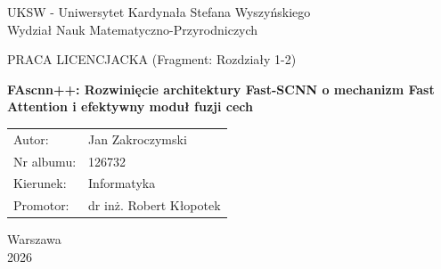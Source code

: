 \documentclass[12pt,oneside]{report}
\newcommand{\uczelnia}{UKSW - Uniwersytet Kardynała Stefana Wyszyńskiego}
\newcommand{\wydzial}{Wydział Nauk Matematyczno-Przyrodniczych}
\newcommand{\kierunek}{Informatyka}
\newcommand{\miasto}{Warszawa}
\newcommand{\rok}{2026}
\newcommand{\autor}{Jan Zakroczymski}
\newcommand{\nrindeksu}{126732}
\newcommand{\promotor}{dr inż. Robert Kłopotek}
\newcommand{\tytul}{FAscnn++: Rozwinięcie architektury Fast-SCNN o mechanizm Fast Attention i efektywny moduł fuzji cech}
\begin{document}
\begin{titlepage}
  \begin{center}
    {\Large \uczelnia \\
    \wydzial \\[1cm]}

    {\Large PRACA LICENCJACKA (Fragment: Rozdziały 1-2) \\[1cm]}

    {\LARGE \textbf{\tytul} \\[1.5cm]}

    \begin{tabular}{p{5cm}p{9cm}}
      Autor: & \autor \\[-2pt]
      Nr albumu: & \nrindeksu \\[-2pt]
      Kierunek: & \kierunek \\[-2pt]
      Promotor: & \promotor \\
    \end{tabular}

    \vfill
    {\large \miasto\\ \rok}
  \end{center}
\end{titlepage}

\tableofcontents




\printbibliography
\end{document}

